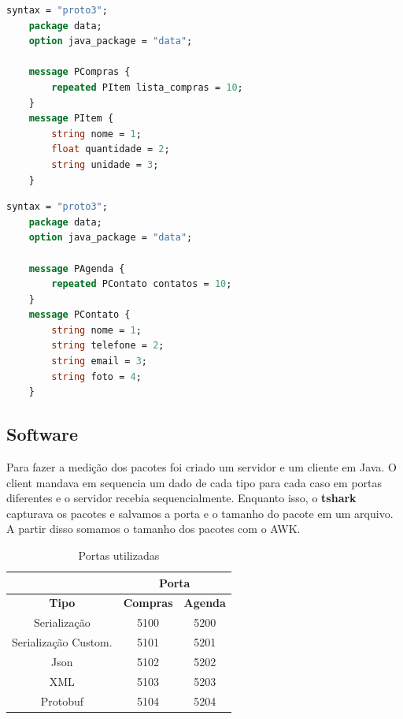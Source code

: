 \documentclass{article}
\begin{document}
\begin{lstlisting}[language=proto, caption=Protobuf utilizado na lista de compras.]
    syntax = "proto3";
    package data;
    option java_package = "data";
    
    message PCompras {
        repeated PItem lista_compras = 10;
    }
    message PItem {
        string nome = 1;
        float quantidade = 2;
        string unidade = 3;
    }
\end{lstlisting}

\begin{lstlisting}[language=proto, caption=Protobuf utilizado na agenda de contatos.]
    syntax = "proto3";
    package data;
    option java_package = "data";
    
    message PAgenda {
        repeated PContato contatos = 10;
    }
    message PContato {
        string nome = 1;
        string telefone = 2;
        string email = 3;
        string foto = 4;
    }
\end{lstlisting}

\subsection{Software}
Para fazer a medição dos pacotes foi criado um servidor e um cliente em Java.
O client mandava em sequencia um dado de cada tipo para cada caso em portas diferentes e
o servidor recebia sequencialmente.
Enquanto isso, o \textbf{tshark} capturava os pacotes e salvamos a porta e o tamanho do pacote em um arquivo.
A partir disso somamos o tamanho dos pacotes com o AWK.

\begin{table}[H]
    \centering
    \begin{tabular}{|c|c|c|}
        \hline
            & \multicolumn{2}{c|}{\textbf{Porta}} \\
            \hline
            \textbf{Tipo} & \textbf{Compras} & \textbf{Agenda} \\
            \hline
            Serialização & 5100 & 5200 \\
            Serialização Custom. & 5101 & 5201 \\
            Json & 5102 & 5202 \\
            XML & 5103 & 5203 \\
            Protobuf & 5104 & 5204 \\
            \hline
    \end{tabular}
    \caption{Portas utilizadas}
\end{table}
\end{document}
